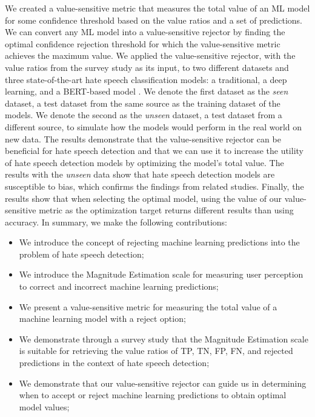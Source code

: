 %
We created a value-sensitive metric that measures the total value of an ML model for some confidence threshold based on the value ratios and a set of predictions.
%
We can convert any ML model into a value-sensitive rejector by finding the optimal confidence rejection threshold for which the value-sensitive metric achieves the maximum value.
%
We applied the value-sensitive rejector, with the value ratios from the survey study as its input, to two different datasets and three state-of-the-art hate speech classification models: a traditional, a deep learning, and a BERT-based model \citep{devlin2018bert}.
%
We denote the first dataset as the \emph{seen} dataset, a test dataset from the same source as the training dataset of the models.
%
We denote the second as the \emph{unseen} dataset, a test dataset from a different source, to simulate how the models would perform in the real world on new data.
%
The results demonstrate that the value-sensitive rejector can be beneficial for hate speech detection and that we can use it to increase the utility of hate speech detection models by optimizing the model's total value.
%
The results with the \emph{unseen} data show that hate speech detection models are susceptible to bias, which confirms the findings from related studies.
%
Finally, the results show that when selecting the optimal model, using the value of our value-sensitive metric as the optimization target returns different results than using accuracy.
%
In summary, we make the following contributions:
%
\begin{itemize}
	\item We introduce the concept of rejecting machine learning predictions into the problem of hate speech detection;
	\item We introduce the Magnitude Estimation scale for measuring user perception to correct and incorrect machine learning predictions;
	\item We present a value-sensitive metric for measuring the total value of a machine learning model with a reject option;
	\item We demonstrate through a survey study that the Magnitude Estimation scale is suitable for retrieving the value ratios of TP, TN, FP, FN, and rejected predictions in the context of hate speech detection;
	\item We demonstrate that our value-sensitive rejector can guide us in determining when to accept or reject machine learning predictions to obtain optimal model values;
\end{itemize}
